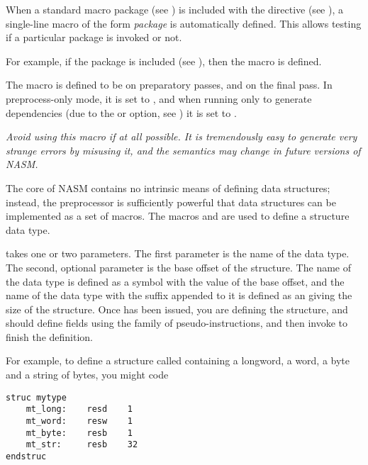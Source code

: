 
When a standard macro package (see ) is included with the
 directive (see ), a single-line macro of
the form \emph{package}\code{\_\_} is automatically defined.
This allows testing if a particular package is invoked or not.

For example, if the  package is included (see ),
then the macro  is defined.


The macro  is defined to be  on preparatory passes,
and  on the final pass.  In preprocess-only mode, it is set to
, and when running only to generate dependencies (due to the
 or  option, see ) it is set to .

\emph{Avoid using this macro if at all possible. It is tremendously easy
to generate very strange errors by misusing it, and the semantics may
change in future versions of NASM.}


The core of NASM contains no intrinsic means of defining data
structures; instead, the preprocessor is sufficiently powerful that
data structures can be implemented as a set of macros. The macros
 and  are used to define a structure
data type.

 takes one or two parameters. The first parameter is the name
of the data type. The second, optional parameter is the base offset of
the structure. The name of the data type is defined as a symbol with
the value of the base offset, and the name of the data type with the
suffix  appended to it is defined as an  giving
the size of the structure. Once  has been issued, you are
defining the structure, and should define fields using the 
family of pseudo-instructions, and then invoke  to finish
the definition.

For example, to define a structure called  containing a
longword, a word, a byte and a string of bytes, you might code

\begin{lstlisting}
struc mytype
    mt_long:    resd    1
    mt_word:    resw    1
    mt_byte:    resb    1
    mt_str:     resb    32
endstruc
\end{lstlisting}

